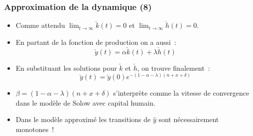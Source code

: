 \documentclass[10pt,notheorems]{beamer}
\theoremstyle{plain}
\theoremstyle{definition} %
\begin{document}
\begin{frame}
  \frametitle{Approximation de la dynamique (8)}

  \begin{itemize}

  \item Comme attendu $\lim_{t\rightarrow\infty}\check{k}(t)=0$ et $\lim_{t\rightarrow\infty}\check{h}(t)=0$.\newline

  \item En partant de la fonction de production on a aussi~:
    \[
      \check{y}(t) = \alpha\check{k}(t) + \lambda\check{h}(t)
    \]

  \item En substituant les solutions pour $\check{k}$ et $\check{h}$, on trouve finalement~:
    \medskip
    \[
      \check{y}(t) = \check{y}(0)e^{-(1-\alpha-\lambda)(n+x+\delta)}
    \]
    \medskip

  \item $\beta = (1-\alpha-\lambda)(n+x+\delta)$ s'interprète comme la vitesse de convergence dans le modèle de Solow avec capital humain.\newline

  \item Dans le modèle approximé les transitions de $\hat y$ sont nécessairement monotones~!

  \end{itemize}
\end{frame}
\end{document}

